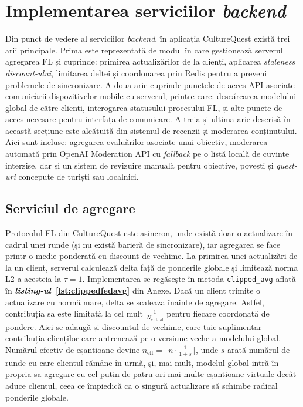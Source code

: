 \documentclass[12pt,a4paper]{report}
\begin{document}
\section{Implementarea serviciilor \textit{backend}}

Din punct de vedere al serviciilor \textit{backend}, în aplicația CultureQuest există trei arii principale. Prima este reprezentată de modul în care gestionează serverul agregarea FL și cuprinde: primirea actualizărilor de la clienți, aplicarea \textit{staleness discount-ului}, limitarea deltei și coordonarea prin Redis pentru a preveni problemele de sincronizare. A doua arie cuprinde punctele de acces API asociate comunicării dispozitivelor mobile cu serverul, printre care: descărcarea modelului global de către clienți, interogarea statusului procesului FL, și alte puncte de acces necesare pentru interfața de comunicare. A treia și ultima arie descrisă în această secțiune este alcătuită din sistemul de recenzii și moderarea conținutului. Aici sunt incluse: agregarea evaluărilor asociate unui obiectiv, moderarea automată prin OpenAI Moderation API cu \textit{fallback} pe o listă locală de cuvinte interzise, dar și un sistem de revizuire manuală pentru obiective, povești și \textit{quest-uri} concepute de turiști sau localnici.

\subsection{Serviciul de agregare}

Protocolul FL din CultureQuest este asincron, unde există doar o actualizare în cadrul unei runde (și nu există barieră de sincronizare), iar agregarea se face printr-o medie ponderată cu discount de vechime. La primirea unei actualizări de la un client, serverul calculează delta față de ponderile globale și limitează norma L2 a acesteia la $\tau = 1$. Implementarea se regăsește în metoda \texttt{clipped\_avg} aflată în \textbf{\textit{listing-ul}~\ref{lst:clippedfedavg}} din Anexe. Dacă un client trimite o actualizare cu normă mare, delta se scalează înainte de agregare. Astfel, contribuția sa este limitată la cel mult $\frac{1}{N_{\mathrm{virtual}}}$ pentru fiecare coordonată de pondere. Aici se adaugă și discountul de vechime, care taie suplimentar contribuția clienților care antrenează pe o versiune veche a modelului global. Numărul efectiv de eșantioane devine $n_{\mathrm{eff}} = \lfloor n \cdot \frac{1}{1+s} \rfloor$, unde $s$ arată numărul de runde cu care clientul rămâne în urmă, și, mai mult, modelul global intră în propria sa agregare cu cel puțin de patru ori mai multe eșantioane virtuale decât aduce clientul, ceea ce împiedică ca o singură actualizare să schimbe radical ponderile globale.
\end{document}
